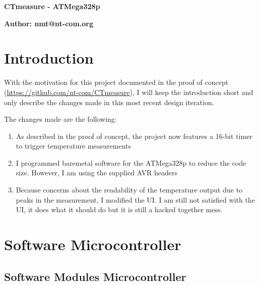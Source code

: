 \documentclass{article}[12pt]
\begin{document}
\begin{center}
\huge{\textbf{CTmeasure - ATMega328p}}
\end{center}

\begin{center}
\textbf{Author: nmt@nt-com.org}
\end{center}


\section{Introduction}

With the motivation for this project documented in the proof of concept (\url{https://github.com/nt-com/CTmeasure}), I will keep the introduction short and only describe the changes made in this most recent design iteration.

The changes made are the following: 

\begin{enumerate}
	\item As described in the proof of concept, the project now features a 16-bit timer to trigger temperature measurements
	\item I programmed baremetal software for the ATMega328p to reduce the code size. However, I am using the supplied AVR headers
	\item Because concerns about the readability of the temperature output due to peaks in the measurement, I modified the UI. I am still not satisfied with the UI, it does what it should do but it is still a hacked together mess.
\end{enumerate}

\section{Software Microcontroller}

\subsection{Software Modules Microcontroller}
\end{document}
